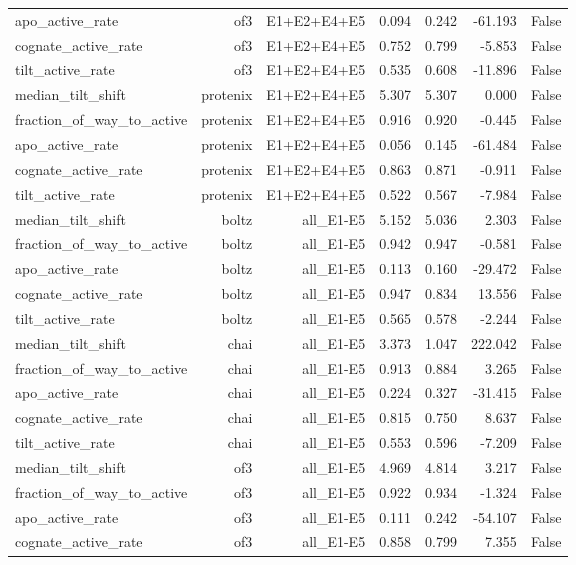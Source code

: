 \begin{longtable}{lrrrrrr}
apo\_active\_rate & of3 & E1+E2+E4+E5 & 0.094 & 0.242 & -61.193 & False \\
cognate\_active\_rate & of3 & E1+E2+E4+E5 & 0.752 & 0.799 & -5.853 & False \\
tilt\_active\_rate & of3 & E1+E2+E4+E5 & 0.535 & 0.608 & -11.896 & False \\
median\_tilt\_shift & protenix & E1+E2+E4+E5 & 5.307 & 5.307 & 0.000 & False \\
fraction\_of\_way\_to\_active & protenix & E1+E2+E4+E5 & 0.916 & 0.920 & -0.445 & False \\
apo\_active\_rate & protenix & E1+E2+E4+E5 & 0.056 & 0.145 & -61.484 & False \\
cognate\_active\_rate & protenix & E1+E2+E4+E5 & 0.863 & 0.871 & -0.911 & False \\
tilt\_active\_rate & protenix & E1+E2+E4+E5 & 0.522 & 0.567 & -7.984 & False \\
median\_tilt\_shift & boltz & all\_E1-E5 & 5.152 & 5.036 & 2.303 & False \\
fraction\_of\_way\_to\_active & boltz & all\_E1-E5 & 0.942 & 0.947 & -0.581 & False \\
apo\_active\_rate & boltz & all\_E1-E5 & 0.113 & 0.160 & -29.472 & False \\
cognate\_active\_rate & boltz & all\_E1-E5 & 0.947 & 0.834 & 13.556 & False \\
tilt\_active\_rate & boltz & all\_E1-E5 & 0.565 & 0.578 & -2.244 & False \\
median\_tilt\_shift & chai & all\_E1-E5 & 3.373 & 1.047 & 222.042 & False \\
fraction\_of\_way\_to\_active & chai & all\_E1-E5 & 0.913 & 0.884 & 3.265 & False \\
apo\_active\_rate & chai & all\_E1-E5 & 0.224 & 0.327 & -31.415 & False \\
cognate\_active\_rate & chai & all\_E1-E5 & 0.815 & 0.750 & 8.637 & False \\
tilt\_active\_rate & chai & all\_E1-E5 & 0.553 & 0.596 & -7.209 & False \\
median\_tilt\_shift & of3 & all\_E1-E5 & 4.969 & 4.814 & 3.217 & False \\
fraction\_of\_way\_to\_active & of3 & all\_E1-E5 & 0.922 & 0.934 & -1.324 & False \\
apo\_active\_rate & of3 & all\_E1-E5 & 0.111 & 0.242 & -54.107 & False \\
cognate\_active\_rate & of3 & all\_E1-E5 & 0.858 & 0.799 & 7.355 & False \\

\end{longtable}
